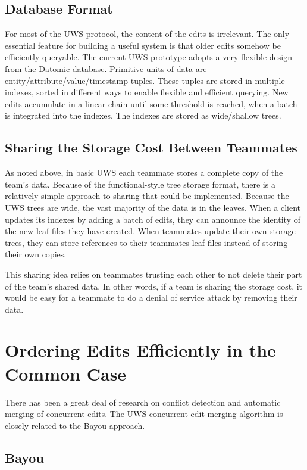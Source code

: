 \documentclass[runningheads]{llncs}
\begin{document}
\subsection{Database Format}

For most of the UWS protocol, the content of the edits is irrelevant.
The only essential feature for building a useful system is that older edits somehow be efficiently queryable.
The current UWS prototype adopts a very flexible design from the Datomic database.
Primitive units of data are entity{\slash}attribute{\slash}value{\slash}timestamp tuples.
These tuples are stored in multiple indexes, sorted in different ways to enable flexible and efficient querying.
New edits accumulate in a linear chain until some threshold is reached, when a batch is integrated into the indexes.
The indexes are stored as wide{\slash}shallow trees.

\subsection{Sharing the Storage Cost Between Teammates}

As noted above, in basic UWS each teammate stores a complete copy of the team's data.
Because of the functional-style tree storage format, there is a relatively simple approach to sharing that could be implemented.
Because the UWS trees are wide, the vast majority of the data is in the leaves.
When a client updates its indexes by adding a batch of edits, they can announce the identity of the new leaf files they have created.
When teammates update their own storage trees, they can store references to their teammates leaf files instead of storing their own copies.

This sharing idea relies on teammates trusting each other to not delete their part of the team's shared data.
In other words, if a team is sharing the storage cost, it would be easy for a teammate to do a denial of service attack by removing their data.

\section{Ordering Edits Efficiently in the Common Case}

There has been a great deal of research on conflict detection and automatic merging of concurrent edits.
The UWS concurrent edit merging algorithm is closely related to the Bayou approach.

\subsection{Bayou}
\end{document}
